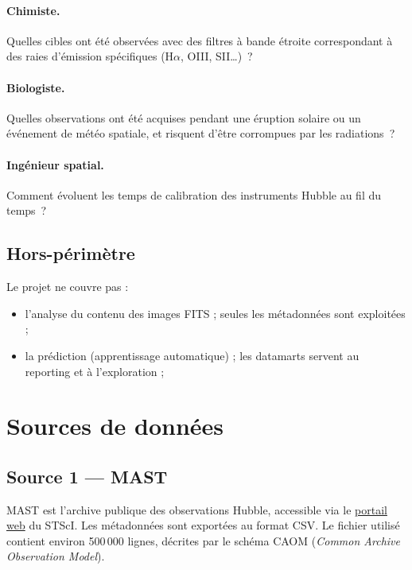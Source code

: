 \documentclass[11pt,a4paper]{article}
\begin{document}
\paragraph{Chimiste.} Quelles cibles ont été observées avec des filtres à bande étroite correspondant à des raies d'émission spécifiques (H$\alpha$, OIII, SII\dots)~?

\paragraph{Biologiste.} Quelles observations ont été acquises pendant une éruption solaire ou un événement de météo spatiale, et risquent d'être corrompues par les radiations~?

\paragraph{Ingénieur spatial.} Comment évoluent les temps de calibration des instruments Hubble au fil du temps~?

\subsection{Hors-périmètre}

Le projet ne couvre pas :

\begin{itemize}
    \item l'analyse du contenu des images FITS ; seules les métadonnées sont exploitées ;
    \item la prédiction (apprentissage automatique) ; les datamarts servent au reporting et à l'exploration ;
\end{itemize}

\newpage
\section{Sources de données}

\subsection{Source 1 --- MAST}

MAST est l'archive publique des observations Hubble, accessible via le \href{https://mast.stsci.edu/portal/Mashup/Clients/Mast/Portal.html}{portail web} du STScI. Les métadonnées sont exportées au format CSV. Le fichier utilisé contient environ 500\,000 lignes, décrites par le schéma CAOM (\textit{Common Archive Observation Model}).
\end{document}
